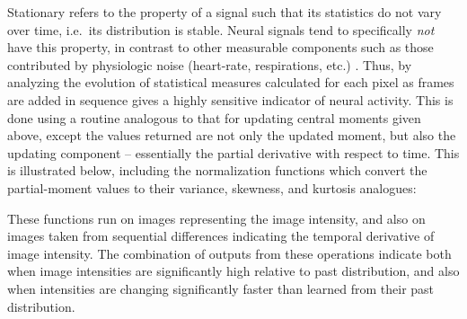 \documentclass[../main.tex]{subfiles}
\begin{document}
Stationary refers to the property of a signal such that its statistics do not vary over time, i.e.~its distribution is stable.
Neural signals tend to specifically \emph{not} have this property, in contrast to other measurable components such as those contributed by physiologic noise (heart-rate, respirations, etc.)
.
Thus, by analyzing the evolution of statistical measures calculated for each pixel as frames are added in sequence gives a highly sensitive indicator of neural activity.
This is done using a routine analogous to that for updating central moments given above, except the values returned are not only the updated moment, but also the updating component -- essentially the partial derivative with respect to time.
This is illustrated below, including the normalization functions which convert the partial-moment values to their variance, skewness, and kurtosis analogues:



These functions run on images representing the image intensity, and also on images taken from sequential differences indicating the temporal derivative of image intensity.
The combination of outputs from these operations indicate both when image intensities are significantly high relative to past distribution, and also when intensities are changing significantly faster than learned from their past distribution.
\end{document}
